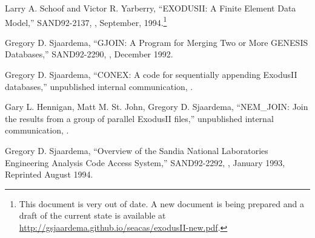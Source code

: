 \begin{thebibliography}{9}

Larry A. Schoof and Victor R. Yarberry, 
``EXODUSII: A Finite Element Data Model,'' 
SAND92-2137, 
\SNLA, 
September, 1994.\footnote{This document is very out of date.  A new
document is being prepared and a draft of the current state is
available at \url{http://gsjaardema.github.io/seacas/exodusII-new.pdf}.}

Gregory D. Sjaardema, 
``GJOIN: A Program for Merging Two or More GENESIS Databases,''
SAND92-2290, 
\SNLA,
December 1992.

Gregory D. Sjaardema,
``CONEX: A code for sequentially appending ExodusII databases,''
unpublished internal communication,
\SNLA.

Gary L. Hennigan, Matt M. St. John, Gregory D. Sjaardema,
``NEM\_JOIN: Join the results from a group of parallel ExodusII files,''
unpublished internal communication,
\SNLA.

Gregory D. Sjaardema,
``Overview of the Sandia National Laboratories Engineering Analysis Code Access System,''
SAND92-2292,
\SNLA,
January 1993, Reprinted August 1994.
\end{thebibliography}
